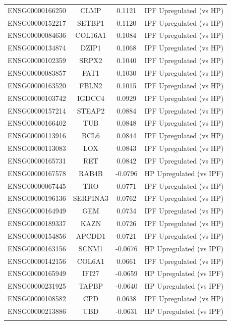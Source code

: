 \documentclass[
]{article}
\begin{document}
\begin{singlespace}
\begin{longtable}[t]{lccc}
\addlinespace
ENSG00000166250 & CLMP & 0.1121 & IPF Upregulated (vs HP)\\
ENSG00000152217 & SETBP1 & 0.1120 & IPF Upregulated (vs HP)\\
ENSG00000084636 & COL16A1 & 0.1084 & IPF Upregulated (vs HP)\\
ENSG00000134874 & DZIP1 & 0.1068 & IPF Upregulated (vs HP)\\
ENSG00000102359 & SRPX2 & 0.1040 & IPF Upregulated (vs HP)\\
\addlinespace
ENSG00000083857 & FAT1 & 0.1030 & IPF Upregulated (vs HP)\\
ENSG00000163520 & FBLN2 & 0.1015 & IPF Upregulated (vs HP)\\
ENSG00000103742 & IGDCC4 & 0.0929 & IPF Upregulated (vs HP)\\
ENSG00000157214 & STEAP2 & 0.0884 & IPF Upregulated (vs HP)\\
ENSG00000166402 & TUB & 0.0848 & IPF Upregulated (vs HP)\\
\addlinespace
ENSG00000113916 & BCL6 & 0.0844 & IPF Upregulated (vs HP)\\
ENSG00000113083 & LOX & 0.0843 & IPF Upregulated (vs HP)\\
ENSG00000165731 & RET & 0.0842 & IPF Upregulated (vs HP)\\
ENSG00000167578 & RAB4B & -0.0796 & HP Upregulated (vs IPF)\\
ENSG00000067445 & TRO & 0.0771 & IPF Upregulated (vs HP)\\
\addlinespace
ENSG00000196136 & SERPINA3 & 0.0762 & IPF Upregulated (vs HP)\\
ENSG00000164949 & GEM & 0.0734 & IPF Upregulated (vs HP)\\
ENSG00000189337 & KAZN & 0.0726 & IPF Upregulated (vs HP)\\
ENSG00000154856 & APCDD1 & 0.0721 & IPF Upregulated (vs HP)\\
ENSG00000163156 & SCNM1 & -0.0676 & HP Upregulated (vs IPF)\\
\addlinespace
ENSG00000142156 & COL6A1 & 0.0661 & IPF Upregulated (vs HP)\\
ENSG00000165949 & IFI27 & -0.0659 & HP Upregulated (vs IPF)\\
ENSG00000231925 & TAPBP & -0.0640 & HP Upregulated (vs IPF)\\
ENSG00000108582 & CPD & 0.0638 & IPF Upregulated (vs HP)\\
ENSG00000213886 & UBD & -0.0631 & HP Upregulated (vs IPF)\\
\addlinespace

\end{longtable}
\end{singlespace}
\end{document}
